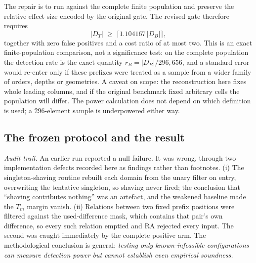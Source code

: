 \documentclass[11pt,a4paper]{article}
\theoremstyle{definition}
\begin{document}
The repair is to run against the complete finite population and preserve the
relative effect size encoded by the original gate. The revised gate therefore
requires
\[
|D_T|\;\ge\;\bigl\lceil 1.104167\,|D_B|\bigr\rceil,
\]
together with zero false positives and a cost ratio of at most two. This is an
exact finite-population comparison, not a significance test: on the complete
population the detection rate is the exact quantity $r_B=|D_B|/296{,}656$, and a
standard error would re-enter only if these prefixes were treated as a sample
from a wider family of orders, depths or geometries. A caveat on scope: the
reconstruction here fixes whole leading columns, and if the original benchmark
fixed arbitrary cells the population will differ. The power calculation does not
depend on which definition is used; a 296-element sample is underpowered either
way.


\subsection{The frozen protocol and the result}
\emph{Audit trail.} An earlier run reported a null failure. It was wrong, through
two implementation defects recorded here as findings rather than footnotes. (i)
The singleton-shaving routine rebuilt each domain from the unary filter on entry,
overwriting the tentative singleton, so shaving never fired; the conclusion that
``shaving contributes nothing'' was an artefact, and the weakened baseline made
the $T_m$ margin vanish. (ii) Relations between two fixed prefix positions were
filtered against the used-difference mask, which contains that pair's own
difference, so every such relation emptied and RA rejected every input. The
second was caught immediately by the complete positive arm. The methodological
conclusion is general: \emph{testing only known-infeasible configurations can
measure detection power but cannot establish even empirical soundness.}
\end{document}

